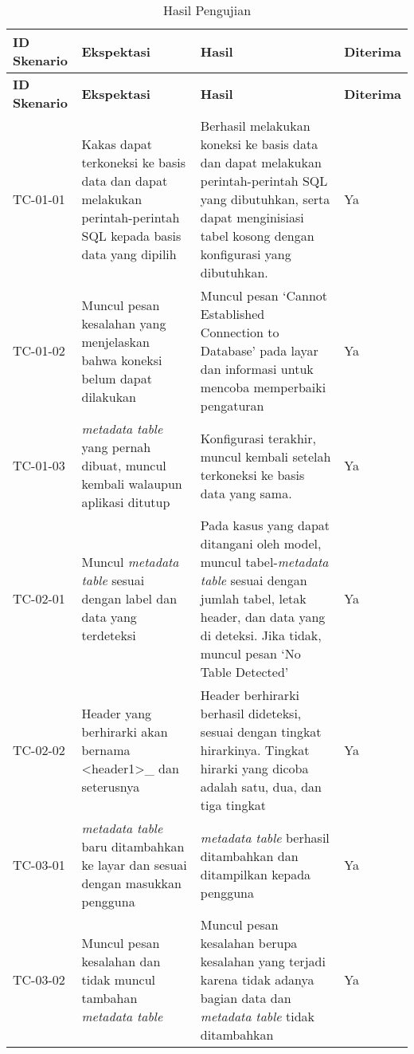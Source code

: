 \begin{small}
\begin{longtable}{ | p{2cm} | p{4cm} | p{4cm} | p{2cm} | }
    \caption{Hasil Pengujian}
    \label{HasilUji}\\ \hline
    \centering\bfseries{ID Skenario} & \centering\bfseries{Ekspektasi} & \centering\bfseries{Hasil} & \centering\bfseries{Diterima} \tabularnewline \hline
    \endfirsthead
    \hline
    \centering\bfseries{ID Skenario} & \centering\bfseries{Ekspektasi} & \centering\bfseries{Hasil} & \centering\bfseries{Diterima} \tabularnewline \hline
    \endhead
    TC-01-01 & Kakas dapat terkoneksi ke basis data dan dapat melakukan perintah-perintah SQL kepada basis data yang dipilih & Berhasil melakukan koneksi ke basis data dan dapat melakukan perintah-perintah SQL yang dibutuhkan, serta dapat menginisiasi tabel kosong dengan konfigurasi yang dibutuhkan. & Ya
	\\ \hline TC-01-02 & Muncul pesan kesalahan yang menjelaskan bahwa koneksi belum dapat dilakukan & Muncul pesan ‘Cannot Established Connection to Database’ pada layar dan informasi untuk mencoba memperbaiki pengaturan & Ya
	\\ \hline TC-01-03 & \textit{metadata table} yang pernah dibuat, muncul kembali walaupun aplikasi ditutup & Konfigurasi terakhir, muncul kembali setelah terkoneksi ke basis data yang sama. & Ya

	\\ \hline TC-02-01 & Muncul \textit{metadata table} sesuai dengan label dan data yang terdeteksi & Pada kasus yang dapat ditangani oleh model, muncul tabel-\textit{metadata table} sesuai dengan jumlah tabel, letak header, dan data yang di deteksi. Jika tidak, muncul pesan ‘No Table Detected’ & Ya
	\\ \hline TC-02-02 & Header yang berhirarki akan bernama <header1>\_<header2> dan seterusnya & Header berhirarki berhasil dideteksi, sesuai dengan tingkat hirarkinya. Tingkat hirarki yang dicoba adalah satu, dua, dan tiga tingkat & Ya

	\\ \hline TC-03-01 & \textit{metadata table} baru ditambahkan ke layar dan sesuai dengan masukkan pengguna & \textit{metadata table} berhasil ditambahkan dan ditampilkan kepada pengguna & Ya
	\\ \hline TC-03-02 & Muncul pesan kesalahan dan tidak muncul tambahan \textit{metadata table} & Muncul pesan kesalahan berupa kesalahan yang terjadi karena tidak adanya bagian data dan \textit{metadata table} tidak ditambahkan & Ya


\end{longtable}
\end{small}
